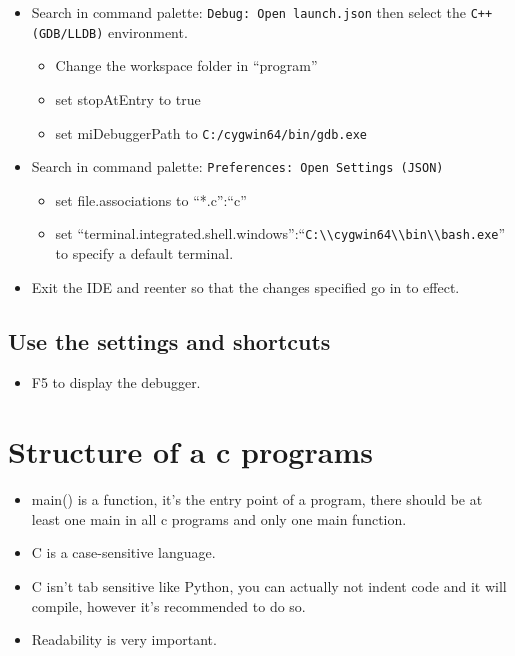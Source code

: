 \begin{itemize}[label=$\downarrow$]
   \item Search in command palette: \verb|Debug: Open launch.json| then select the \verb|C++(GDB/LLDB)| environment.
      \begin{itemize}
         \item Change the workspace folder in ``program''
         \item set stopAtEntry to true 
         \item set miDebuggerPath to \verb|C:/cygwin64/bin/gdb.exe|
      \end{itemize}

      
   \item Search in command palette: \verb|Preferences: Open Settings (JSON)|
      \begin{itemize}
         \item set file.associations to ``*.c'':``c''
         \item set ``terminal.integrated.shell.windows'':``\verb|C:\\cygwin64\\bin\\bash.exe|'' to specify a default terminal.
      \end{itemize}
   
   \item Exit the IDE and reenter so that the changes specified go in to effect. 
\end{itemize}


\subsection{Use the settings and shortcuts}  
\begin{itemize}
   \item F5 to display the debugger. 
\end{itemize}


\section{Structure of a c programs}
\begin{itemize}
   \item main() is a function, it's the entry point of a program, there should be at least one main in all c programs and only one main function.
   \item C is a case-sensitive language.
   \item C isn't tab sensitive like Python, you can actually not indent code and it will compile, however it's recommended to do so. 
   \item Readability is very important. 
\end{itemize}
